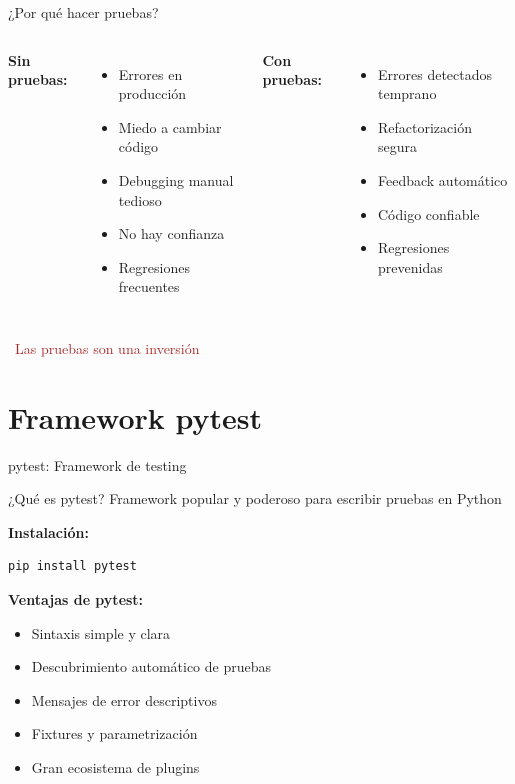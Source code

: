 \documentclass{beamer}
\begin{document}
\begin{frame}{¿Por qué hacer pruebas? \faQuestion}
\begin{columns}[T]
\textbf{Sin pruebas:} \faTimesCircle
\small
\begin{itemize}
    \item Errores en producción
    \item Miedo a cambiar código
    \item Debugging manual tedioso
    \item No hay confianza
    \item Regresiones frecuentes
\end{itemize}

\textbf{Con pruebas:} \faCheckCircle
\small
\begin{itemize}
    \item Errores detectados temprano
    \item Refactorización segura
    \item Feedback automático
    \item Código confiable
    \item Regresiones prevenidas
\end{itemize}
\end{columns}

\vspace{0.3cm}
\begin{center}
\textcolor{brown}{\faLightbulb\ Las pruebas son una inversión}
\end{center}
\end{frame}

\section{Framework pytest}

\begin{frame}[fragile]{pytest: Framework de testing \faFlask}
\begin{conceptbox}{¿Qué es pytest?}
Framework popular y poderoso para escribir pruebas en Python
\end{conceptbox}

\textbf{Instalación:}
\begin{lstlisting}[language=bash, numbers=none]
pip install pytest
\end{lstlisting}

\vspace{0.2cm}
\textbf{Ventajas de pytest:}
\small
\begin{itemize}
    \item[\faCheck] Sintaxis simple y clara
    \item[\faCheck] Descubrimiento automático de pruebas
    \item[\faCheck] Mensajes de error descriptivos
    \item[\faCheck] Fixtures y parametrización
    \item[\faCheck] Gran ecosistema de plugins
\end{itemize}
\end{frame}
\end{document}

